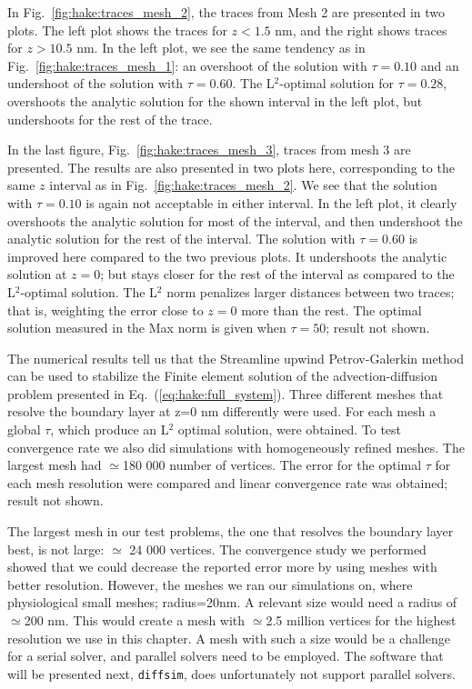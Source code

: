In Fig.~\ref{fig:hake:traces_mesh_2}, the traces from Mesh 2 are
presented in two plots. The left plot shows the traces for $z<1.5$ nm,
and the right shows traces for $z>10.5$ nm. In the left plot, we see
the same tendency as in Fig.~\ref{fig:hake:traces_mesh_1}: an
overshoot of the solution with $\tau=0.10$ and an undershoot of the
solution with $\tau=0.60$. The L$^2$-optimal solution for $\tau=0.28$,
overshoots the analytic solution for the shown interval in the left
plot, but undershoots for the rest of the trace.

In the last figure, Fig.~\ref{fig:hake:traces_mesh_3}, traces from
mesh 3 are presented. The results are also presented in two plots
here, corresponding to the same $z$ interval as in
Fig.~\ref{fig:hake:traces_mesh_2}. We see that the solution with
$\tau=0.10$ is again not acceptable in either interval. In the left
plot, it clearly overshoots the analytic solution for most of the
interval, and then undershoot the analytic solution for the rest of
the interval. The solution with $\tau=0.60$ is improved here compared
to the two previous plots. It undershoots the analytic solution at
$z=0$; but stays closer for the rest of the interval as compared to
the L$^2$-optimal solution. The L$^2$ norm penalizes larger distances
between two traces; that is, weighting the error close to $z=0$ more
than the rest. The optimal solution measured in the Max norm is given
when $\tau=50$; result not shown.

The numerical results tell us that the Streamline upwind
Petrov-Galerkin method can be used to stabilize the Finite element
solution of the advection-diffusion problem presented in
Eq.~(\ref{eq:hake:full_system}). Three different meshes that resolve
the boundary layer at z=0 nm differently were used. For each mesh a
global $\tau$, which produce an L$^2$ optimal solution, were
obtained. To test convergence rate we also did simulations with
homogeneously refined meshes. The largest mesh had $\simeq$180 000
number of vertices. The error for the optimal $\tau$ for each mesh
resolution were compared and linear convergence rate was obtained;
result not shown.

The largest mesh in our test problems, the one that resolves the
boundary layer best, is not large: $\simeq$ 24 000 vertices. The
convergence study we performed showed that we could decrease the
reported error more by using meshes with better resolution. However,
the meshes we ran our simulations on, where physiological small
meshes; radius=20nm. A relevant size would need a radius of
$\simeq$200 nm. This would create a mesh with $\simeq$2.5 million
vertices for the highest resolution we use in this chapter. A mesh
with such a size would be a challenge for a serial solver, and
parallel solvers need to be employed. The software that will be
presented next, \texttt{diffsim}, does unfortunately not support
parallel solvers.

